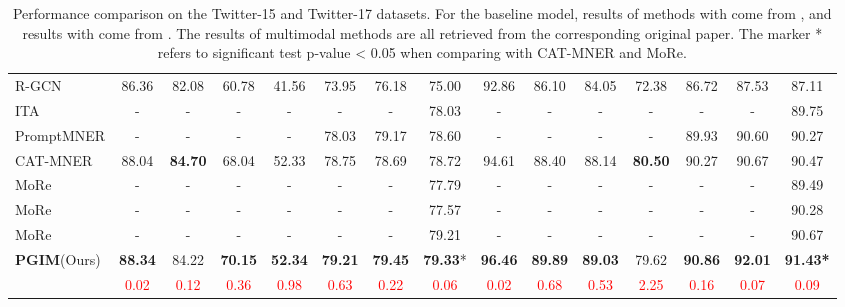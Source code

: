 \documentclass[11pt]{article}
\begin{document}
\begin{table*}[!]
\begin{tabular}{lcccccccccccccc}
R-GCN &  \multicolumn{1}{|c}{86.36} &  82.08 &  60.78 &\multicolumn{1}{c|}{41.56} &  73.95 &  76.18 &  \multicolumn{1}{c|}{75.00} &  92.86 &  86.10 &  84.05 &  \multicolumn{1}{c|}{72.38} &  86.72 &  87.53 &  87.11 \\
ITA &  \multicolumn{1}{|c}{-} &  - &  - &  \multicolumn{1}{c|}{-} &  - &  - &  \multicolumn{1}{c|}{78.03} &  - &  - &  - &  \multicolumn{1}{c|}{-} &  - &  - &  89.75 \\
PromptMNER &  \multicolumn{1}{|c}{-} &  - &  - &  \multicolumn{1}{c|}{-} &  78.03 &  79.17 &  \multicolumn{1}{c|}{78.60} &  - &  - &  - &\multicolumn{1}{c|}{-} &  89.93 &  90.60 &  90.27 \\
CAT-MNER &  \multicolumn{1}{|c}{88.04} &  \textbf{84.70} &  68.04 &  \multicolumn{1}{c|}{52.33} &  78.75 &  78.69 &  \multicolumn{1}{c|}{78.72} &  94.61 &  88.40 &  88.14 &  \multicolumn{1}{c|}{\textbf{80.50}} &  90.27 &  90.67 &  90.47\\
MoRe &  \multicolumn{1}{|c}{-} &  - &  - &  \multicolumn{1}{c|}{-} &  - &  - &
\multicolumn{1}{c|}{77.79} &  - &- &  - &  \multicolumn{1}{c|}{-} &  - &  - &  89.49 \\
MoRe &  \multicolumn{1}{|c}{-} &  - &  - &  \multicolumn{1}{c|}{-} &  - &  - &
\multicolumn{1}{c|}{77.57} &  - &- &  - &  \multicolumn{1}{c|}{-} &  - &  - &  90.28 \\
MoRe &  \multicolumn{1}{|c}{-} &  - &  - &  \multicolumn{1}{c|}{-} &  - &  - &
\multicolumn{1}{c|}{79.21} &  - &- &  - &  \multicolumn{1}{c|}{-} &  - &  - &  90.67 \\
\textbf{PGIM}(Ours) &  \multicolumn{1}{|c}{\textbf{88.34}} &  84.22 &  \textbf{70.15} &  \multicolumn{1}{c|}{\textbf{52.34}} &  \textbf{79.21} &  \textbf{79.45} &  \multicolumn{1}{c|}{\textbf{79.33}*} &  \textbf{96.46} &  \textbf{89.89} &  \textbf{89.03} &  \multicolumn{1}{c|}{79.62} &  \textbf{90.86} &  \textbf{92.01} & \textbf{91.43*} \\
      &  \multicolumn{1}{|c}{\textcolor{red}{0.02}} &  \textcolor{red}{0.12} &  \textcolor{red}{0.36} &  \multicolumn{1}{c|}{\textcolor{red}{0.98}} &  \textcolor{red}{0.63} &  \textcolor{red}{0.22} & 
\multicolumn{1}{c|}{\textcolor{red}{0.06}} &  \textcolor{red}{0.02} &\textcolor{red}{0.68} &  \textcolor{red}{0.53} &  \multicolumn{1}{c|}{\textcolor{red}{2.25}} &  \textcolor{red}{0.16} &  \textcolor{red}{0.07} &  \textcolor{red}{0.09} \\

\bottomrule
\end{tabular}
\caption{Performance comparison on the Twitter-15 and Twitter-17 datasets. For the baseline model, results of methods with  come from 
\citet{yu2020improving}, and results with  come from  \citet{wang2022cat}. The results of multimodal methods are all retrieved from the corresponding original paper. The marker * refers to significant test p-value < 0.05 when comparing with CAT-MNER and MoRe.}
\label{tab:maintabel}
\end{table*}
\end{document}
